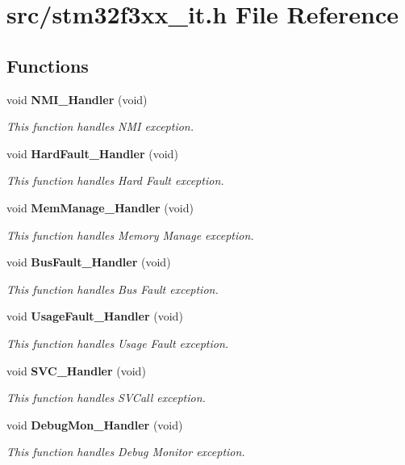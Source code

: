 \section{src/stm32f3xx\+\_\+it.h File Reference}
\label{stm32f3xx__it_8h}
\subsection*{Functions}
\begin{DoxyCompactItemize}
\item 
void \textbf{ N\+M\+I\+\_\+\+Handler} (void)
\begin{DoxyCompactList}\small\item\em This function handles N\+MI exception. \end{DoxyCompactList}\item 
void \textbf{ Hard\+Fault\+\_\+\+Handler} (void)
\begin{DoxyCompactList}\small\item\em This function handles Hard Fault exception. \end{DoxyCompactList}\item 
void \textbf{ Mem\+Manage\+\_\+\+Handler} (void)
\begin{DoxyCompactList}\small\item\em This function handles Memory Manage exception. \end{DoxyCompactList}\item 
void \textbf{ Bus\+Fault\+\_\+\+Handler} (void)
\begin{DoxyCompactList}\small\item\em This function handles Bus Fault exception. \end{DoxyCompactList}\item 
void \textbf{ Usage\+Fault\+\_\+\+Handler} (void)
\begin{DoxyCompactList}\small\item\em This function handles Usage Fault exception. \end{DoxyCompactList}\item 
void \textbf{ S\+V\+C\+\_\+\+Handler} (void)
\begin{DoxyCompactList}\small\item\em This function handles S\+V\+Call exception. \end{DoxyCompactList}\item 
void \textbf{ Debug\+Mon\+\_\+\+Handler} (void)
\begin{DoxyCompactList}\small\item\em This function handles Debug Monitor exception. \end{DoxyCompactList}\item 

\end{DoxyCompactItemize}
